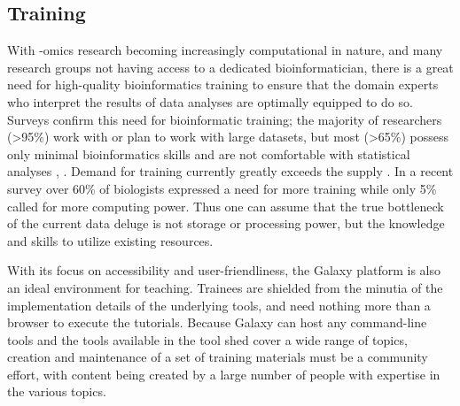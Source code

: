\begin{justify}
\subsection{Training}
With -omics research becoming increasingly computational in nature, and many research groups not having access to a dedicated bioinformatician, there is a great need for high-quality bioinformatics training to ensure that the domain experts who interpret the results of data analyses are optimally equipped to do so. Surveys confirm this need for bioinformatic training; the majority of researchers (>95\%) work with or plan to work with large datasets, but most (>65\%) possess only minimal bioinformatics skills and are not comfortable with statistical analyses \cite{larcombe2017elixir}, \cite{williams2017vision}. Demand for training currently greatly exceeds the supply \cite{attwood2017global}. In a recent survey \cite{survey2013embl} over 60\% of biologists expressed a need for more training while only 5\% called for more computing power. Thus one can assume that the true bottleneck of the current data deluge is not storage or processing power, but the knowledge and skills to utilize existing resources.

With its focus on accessibility and user-friendliness, the Galaxy platform is also an ideal environment for teaching. Trainees are shielded from the minutia of the implementation details of the underlying tools, and need nothing more than a browser to execute the tutorials. Because Galaxy can host any command-line tools and the tools available in the tool shed cover a wide range of topics, creation and maintenance of a set of training materials must be a community effort, with content being created by a large number of people with expertise in the various topics.





\end{justify}
